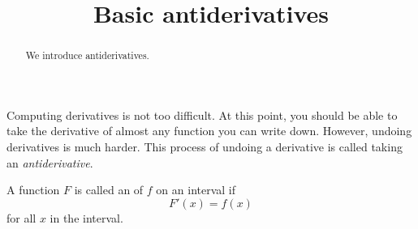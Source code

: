 \documentclass{ximera}
\title[Dig-In:]{Basic antiderivatives}
\begin{document}
\begin{abstract}
  We introduce antiderivatives.
\end{abstract}
\maketitle


Computing derivatives is not too difficult. At this point, you should
be able to take the derivative of almost any function you can write
down. However, undoing derivatives is much harder. This process of
undoing a derivative is called taking an \textit{antiderivative}.

\begin{definition}
A function $F$ is called an  of $f$ on an
interval if
\[
F'(x) = f(x)
\]
for all $x$ in the interval.
\end{definition}

\end{document}
